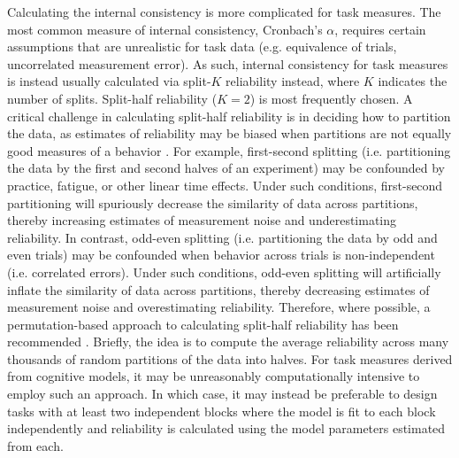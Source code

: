 \documentclass[a4paper,notitlepage,12pt]{article}
\begin{document}
Calculating the internal consistency is more complicated for task measures. The most common measure of internal consistency, Cronbach's $\alpha$, requires certain assumptions that are unrealistic for task data (e.g. equivalence of trials, uncorrelated measurement error). As such, internal consistency for task measures is instead usually calculated via split-$K$ reliability instead, where $K$ indicates the number of splits. Split-half reliability ($K=2$) is most frequently chosen. A critical challenge in calculating split-half reliability is in deciding how to partition the data, as estimates of reliability may be biased when partitions are not equally good measures of a behavior \cite{Green2016-xw, pronk2022can}. For example, first-second splitting (i.e. partitioning the data by the first and second halves of an experiment) may be confounded by practice, fatigue, or other linear time effects. Under such conditions, first-second partitioning will spuriously decrease the similarity of data across partitions, thereby increasing estimates of measurement noise and underestimating reliability. In contrast, odd-even splitting (i.e. partitioning the data by odd and even trials) may be confounded when behavior across trials is non-independent (i.e. correlated errors). Under such conditions, odd-even splitting will artificially inflate the similarity of data across partitions, thereby decreasing estimates of measurement noise and overestimating reliability. Therefore, where possible, a permutation-based approach to calculating split-half reliability has been recommended \cite{pronk2022can, Parsons2019-jw}. Briefly, the idea is to compute the average reliability across many thousands of random partitions of the data into halves. For task measures derived from cognitive models, it may be unreasonably computationally intensive to employ such an approach. In which case, it may instead be preferable to design tasks with at least two independent blocks where the model is fit to each block independently and reliability is calculated using the model parameters estimated from each. 
\end{document}
